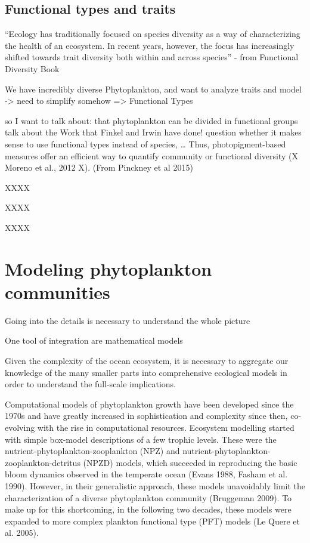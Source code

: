 \subsection{Functional types and traits}

“Ecology has traditionally focused on species diversity as a way of characterizing the
health of an ecosystem. In recent years, however, the focus has increasingly shifted
towards trait diversity both within and across species” - from Functional Diversity Book

We have incredibly diverse Phytoplankton, and want to analyze traits and model -> need to simplify somehow => Functional Types

so I want to talk about:
that phytoplankton can be divided in functional groups
talk about the Work that Finkel and Irwin have done! 
question whether it makes sense to use functional types instead of species, …
Thus, photopigment-based measures offer an efficient way to quantify community or functional diversity (X Moreno et al., 2012 X). (From Pinckney et al 2015)



XXXX


XXXX


XXXX


\section{Modeling phytoplankton communities}
Going into the details is necessary to understand the whole picture

One tool of integration are mathematical models

Given the complexity of the ocean ecosystem, it is necessary to aggregate our knowledge of the many smaller parts into comprehensive ecological models in order to understand the full-scale implications. 

Computational models of phytoplankton growth have been developed since the 1970s and have greatly increased in sophistication and complexity since then, co-evolving with the rise in computational resources. Ecosystem modelling started with simple box-model descriptions of a few trophic levels. These were the nutrient-phytoplankton-zooplankton (NPZ) and nutrient-phytoplankton-zooplankton-detritus (NPZD) models, which succeeded in reproducing the basic bloom dynamics observed in the temperate ocean (Evans 1988, Fasham et al. 1990). However, in their generalistic approach, these models unavoidably limit the characterization of a diverse phytoplankton community (Bruggeman 2009). To make up for this shortcoming, in the following two decades, these models were expanded to more complex plankton functional type (PFT) models (Le Quere et al. 2005). 

